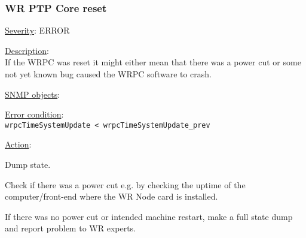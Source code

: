 \subsubsection{\bf WR PTP Core reset}
		\label{fail:other:reset}
		\begin{pck_descr}
			\item [] \underline{Severity}: ERROR
			\item [] \underline{Description}:\\
				If the WRPC was reset it might either mean that there was a power cut or
				some not yet known bug caused the WRPC software to crash.
			\item [] \underline{SNMP objects}:\\
				{\footnotesize
				 }
			\item [] \underline{Error condition}:\\
				{\footnotesize
				\texttt{wrpcTimeSystemUpdate < wrpcTimeSystemUpdate\_prev} }
      \item [] \underline{Action}:
        \begin{pck_proc}
        \item Dump state.
        \item Check if there was a power cut e.g. by checking the uptime of the
          computer/front-end where the WR Node card is installed.
        \item If there was no power cut or intended machine restart, make a full
          state dump and report problem to WR experts.
        \end{pck_proc}
		\end{pck_descr}

